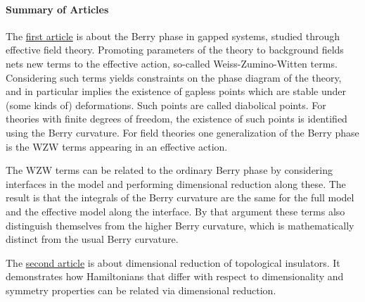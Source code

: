 \paragraph{Summary of Articles}
The \href{https://journals-aps-org.focus.lib.kth.se/prb/pdf/10.1103/PhysRevB.102.245113}{first article} is about the Berry phase in gapped systems, studied through effective field theory. Promoting parameters of the theory to background fields nets new terms to the effective action, so-called Weiss-Zumino-Witten terms. Considering such terms yields constraints on the phase diagram of the theory, and in particular implies the existence of gapless points which are stable under (some kinds of) deformations. Such points are called diabolical points. For theories with finite degrees of freedom, the existence of such points is identified using the Berry curvature. For field theories one generalization of the Berry phase is the WZW terms appearing in an effective action.

The WZW terms can be related to the ordinary Berry phase by considering interfaces in the model and performing dimensional reduction along these. The result is that the integrals of the Berry curvature are the same for the full model and the effective model along the interface. By that argument these terms also distinguish themselves from the higher Berry curvature, which is mathematically distinct from the usual Berry curvature.

The \href{https://iopscience.iop.org/article/10.1088/1367-2630/12/6/065010/pdf}{second article} is about dimensional reduction of topological insulators. It demonstrates how Hamiltonians that differ with respect to dimensionality and symmetry properties can be related via dimensional reduction.